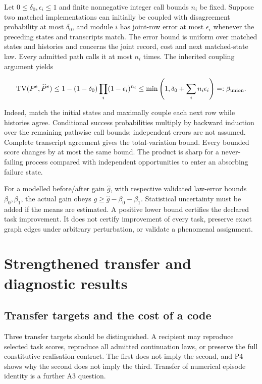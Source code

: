 \documentclass[
  11pt,
  a4paper,
]{article}
\begin{document}
Let \(0\le\delta_0,\epsilon_i\le1\) and finite nonnegative integer call
bounds \(n_i\) be fixed. Suppose two matched implementations can
initially be coupled with disagreement probability at most \(\delta_0\),
and module \(i\) has joint-row error at most \(\epsilon_i\) whenever the
preceding states and transcripts match. The error bound is uniform over
matched states and histories and concerns the joint record, cost and
next matched-state law. Every admitted path calls it at most \(n_i\)
times. The inherited coupling argument yields

\[
\operatorname{TV}(P^e,\widehat P^e)
\le1-(1-\delta_0)\prod_i(1-\epsilon_i)^{n_i}
\le\min\left(1,\delta_0+\sum_i n_i\epsilon_i\right)=:\beta_{\rm union}.
\]

Indeed, match the initial states and maximally couple each next row
while histories agree. Conditional success probabilities multiply by
backward induction over the remaining pathwise call bounds; independent
errors are not assumed. Complete transcript agreement gives the
total-variation bound. Every bounded score changes by at most the same
bound. The product is sharp for a never-failing process compared with
independent opportunities to enter an absorbing failure state.

For a modelled before/after gain \(\widehat g\), with respective
validated law-error bounds \(\beta_0,\beta_1\), the actual gain obeys
\(g\ge\widehat g-\beta_0-\beta_1\). Statistical uncertainty must be
added if the means are estimated. A positive lower bound certifies the
declared task improvement. It does not certify improvement of every
task, preserve exact graph edges under arbitrary perturbation, or
validate a phenomenal assignment.

\section{Strengthened transfer and diagnostic
results}\label{strengthened-transfer-and-diagnostic-results}

\subsection{Transfer targets and the cost of a
code}\label{transfer-targets-and-the-cost-of-a-code}

Three transfer targets should be distinguished. A recipient may
reproduce selected task scores, reproduce all admitted continuation
laws, or preserve the full constitutive realisation contract. The first
does not imply the second, and P4 shows why the second does not imply
the third. Transfer of numerical episode identity is a further A3
question.
\end{document}
